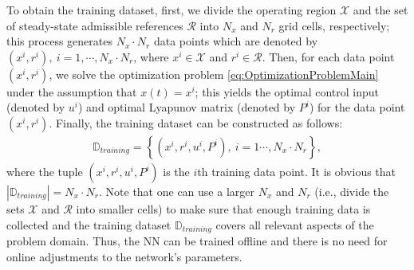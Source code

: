 \documentclass[1p,times]{elsarticle}
\begin{document}
To obtain the training dataset, first, we divide the operating region $\mathcal{X}$ and the set of steady-state admissible references $\mathcal{R}$ into $N_x$ and $N_r$ grid cells, respectively; this process generates $N_x\cdot N_r$ data points which are denoted by $(x^i,r^i),~i=1,\cdots,N_x\cdot N_r$, where $x^i\in\mathcal{X}$ and $r^i\in\mathcal{R}$. Then, for each data point $(x^i,r^i)$, we solve the optimization problem \eqref{eq:OptimizationProblemMain} under the assumption that $x(t)=x^i$; this yields the optimal control input (denoted by $u^i$) and optimal Lyapunov matrix (denoted by $P^i$) for the data point $(x^i,r^i)$. Finally, the training dataset can be constructed as follows:
\begin{align}
\mathbb{D}_{training}=\left\{\left(x^i,r^i,u^i,P^i\right),~i=1\cdots,N_x\cdot N_r\right\},
\end{align}
where the tuple $\left(x^i,r^i,u^i,P^i\right)$ is the $i$th training data point. It is obvious that $|\mathbb{D}_{training}|=N_x\cdot N_r$. {{\color{blue}}Note that one can use a larger $N_x$ and $N_r$ (i.e., divide the sets $\mathcal{X}$ and $\mathcal{R}$ into smaller cells) to make sure that enough training data is collected and the training dataset $\mathbb{D}_{training}$ covers all relevant aspects of the problem domain. Thus, the NN can be trained offline and there is no need for online adjustments to the network's parameters.}






\end{document}
